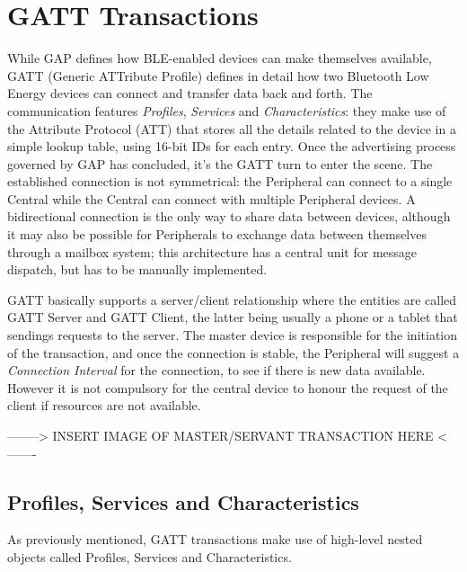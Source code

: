 \section{GATT Transactions}
While GAP defines how BLE-enabled devices can make themselves available, GATT (Generic ATTribute Profile) defines in detail how two Bluetooth Low Energy devices can connect and transfer data back and forth.
The communication features \textit{Profiles}, \textit{Services} and \textit{Characteristics}: they make use of the Attribute Protocol (ATT) that stores all the details related to the device in a simple lookup table, using 16-bit IDs for each entry.
Once the advertising process governed by GAP has concluded, it's the GATT turn to enter the scene. The established connection is not symmetrical: the Peripheral can connect to a single Central while the Central can connect with multiple Peripheral devices. A bidirectional connection is the only way to share data between devices, although it may also be possible for Peripherals to exchange data between themselves through a mailbox system; this architecture has a central unit for message dispatch, but has to be manually implemented.

GATT basically supports a server/client relationship where the entities are called GATT Server and GATT Client, the latter being usually a phone or a tablet that sendings requests to the server. The master device is responsible for the initiation of the transaction, and once the connection is stable, the Peripheral will suggest a \textit{Connection Interval} for the connection, to see if there is new data available. However it is not compulsory for the central device to honour the request of the client if resources are not available.


--------> INSERT IMAGE OF MASTER/SERVANT TRANSACTION HERE <-------

\subsection{Profiles, Services and Characteristics}
As previously mentioned, GATT transactions make use of high-level nested objects called Profiles, Services and Characteristics.

